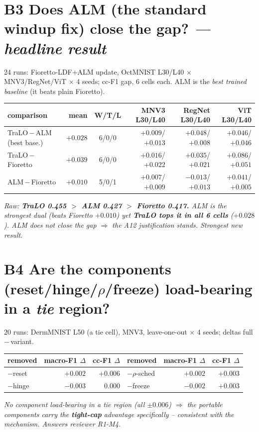 \documentclass[10pt,a4paper]{article}
\newcommand{\vs}[2]{#1\,$-$\,#2}
\newcommand{\fnd}[1]{{\small\textit{#1}}\par}
\newcommand{\tbl}[1]{\begin{center}\footnotesize #1\end{center}}
\begin{document}
\section*{B3 \; Does ALM (the standard windup fix) close the gap? \normalfont\itshape --- headline result}
{\footnotesize 24 runs: Fioretto-LDF$+$ALM update, OctMNIST L30/L40 $\times$ MNV3/RegNet/ViT $\times$ 4 seeds;
cc-F1 gap, 6 cells each. ALM is the \emph{best trained baseline} (it beats plain Fioretto).}
\tbl{\begin{tabular}{lrcrrr}
\toprule
comparison & mean & W/T/L & MNV3 L30/L40 & RegNet L30/L40 & ViT L30/L40 \\
\midrule
\vs{TraLO}{ALM} \footnotesize(best base.) & $\mathbf{+0.028}$ & 6/0/0 & $+0.009$/$+0.013$ & $+0.048$/$+0.008$ & $+0.046$/$+0.046$ \\
\vs{TraLO}{Fioretto} & $+0.039$ & 6/0/0 & $+0.016$/$+0.022$ & $+0.035$/$+0.021$ & $+0.086$/$+0.051$ \\
\vs{ALM}{Fioretto}   & $+0.010$ & 5/0/1 & $+0.007$/$+0.009$ & $-0.013$/$+0.013$ & $+0.041$/$+0.005$ \\
\bottomrule
\end{tabular}}
\fnd{Raw: \textbf{TraLO 0.455 $>$ ALM 0.427 $>$ Fioretto 0.417.} ALM \emph{is} the strongest dual (beats
Fioretto $+0.010$) yet \textbf{TraLO tops it in all 6 cells} ($+0.028$). ALM does not close the gap
$\Rightarrow$ the A12 justification stands. Strongest new result.}

\section*{B4 \; Are the components (reset/hinge/$\rho$/freeze) load-bearing in a \emph{tie} region?}
{\footnotesize 20 runs: DermMNIST L50 (a tie cell), MNV3, leave-one-out $\times$ 4 seeds; deltas
\vs{full}{variant}.}
\tbl{\begin{tabular}{lrr@{\qquad\qquad}lrr}
\toprule
removed & macro-F1 $\Delta$ & cc-F1 $\Delta$ & removed & macro-F1 $\Delta$ & cc-F1 $\Delta$ \\
\midrule
$-$reset & $+0.002$ & $+0.006$ & $-\rho$-sched & $+0.002$ & $+0.003$ \\
$-$hinge & $-0.003$ & $\phantom{+}0.000$ & $-$freeze & $-0.002$ & $+0.003$ \\
\bottomrule
\end{tabular}}
\fnd{No component load-bearing in a tie region (all $\pm0.006$) $\Rightarrow$ the portable components carry the
\textbf{tight-cap} advantage specifically -- consistent with the mechanism. Answers reviewer R1-M4.}
\end{document}

